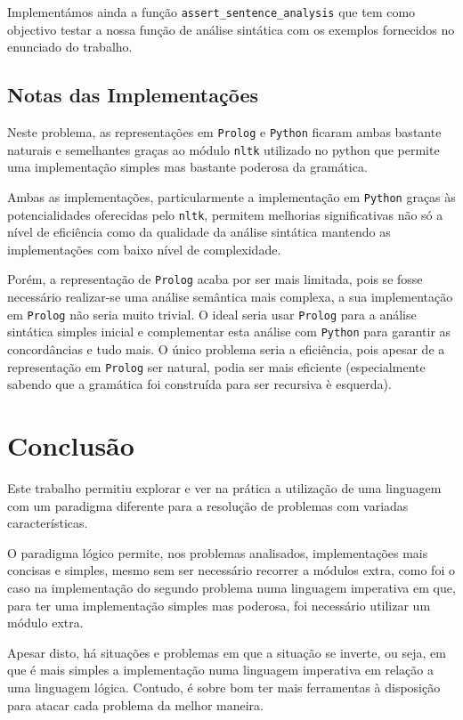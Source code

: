 \documentclass[12pt,a4paper,oneside]{article}
\begin{document}
Implementámos ainda a função \texttt{assert\_sentence\_analysis} que
tem como objectivo testar a nossa função de análise sintática com os
exemplos fornecidos no enunciado do trabalho.

\subsection{Notas das Implementações}

Neste problema, as representações em \texttt{Prolog} e \texttt{Python}
ficaram ambas bastante naturais e semelhantes graças ao módulo
\texttt{nltk} utilizado no python que permite uma implementação
simples mas bastante poderosa da gramática.

Ambas as implementações, particularmente a implementação em
\texttt{Python} graças às potencialidades oferecidas pelo
\texttt{nltk}, permitem melhorias significativas não só a nível de
eficiência como da qualidade da análise sintática mantendo as
implementações com baixo nível de complexidade.

Porém, a representação de \texttt{Prolog} acaba por ser mais limitada,
pois se fosse necessário realizar-se uma análise semântica mais
complexa, a sua implementação em \texttt{Prolog} não seria muito
trivial. O ideal seria usar \texttt{Prolog} para a análise sintática
simples inicial e complementar esta análise com \texttt{Python} para
garantir as concordâncias e tudo mais. O único problema seria a
eficiência, pois apesar de a representação em \texttt{Prolog} ser
natural, podia ser mais eficiente (especialmente sabendo que a
gramática foi construída para ser recursiva è esquerda).


\section{Conclusão}
\label{sec:conc}

Este trabalho permitiu explorar e ver na prática a utilização de uma
linguagem com um paradigma diferente para a resolução de problemas com
variadas características.

O paradigma lógico permite, nos problemas analisados, implementações
mais concisas e simples, mesmo sem ser necessário recorrer a módulos
extra, como foi o caso na implementação do segundo problema numa
linguagem imperativa em que, para ter uma implementação simples mas
poderosa, foi necessário utilizar um módulo extra.

Apesar disto, há situações e problemas em que a situação se inverte,
ou seja, em que é mais simples a implementação numa linguagem
imperativa em relação a uma linguagem lógica. Contudo, é sobre bom ter
mais ferramentas à disposição para atacar cada problema da melhor
maneira.




\end{document}
